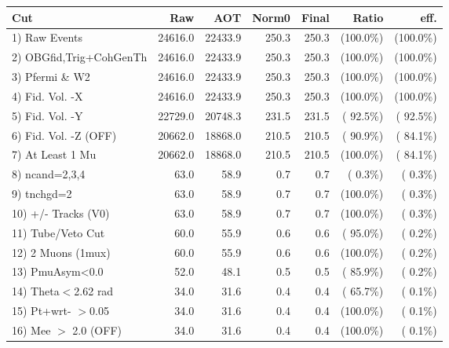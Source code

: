  \begin{table}[h!]\centering
 \begin{tabular}{||l||r|r|r|r|r|r||}
 \hline
 \hline
 Cut & Raw & AOT & Norm0 & Final & Ratio & eff.       \\
 \hline
  1) Raw Events           &      24616.0 &      22433.9 &        250.3 &        250.3 & (100.0\%) & (100.0\%) \\
  2) OBGfid,Trig+CohGenTh &      24616.0 &      22433.9 &        250.3 &        250.3 & (100.0\%) & (100.0\%) \\
  3) Pfermi \& W2         &      24616.0 &      22433.9 &        250.3 &        250.3 & (100.0\%) & (100.0\%) \\
  4) Fid. Vol. -X         &      24616.0 &      22433.9 &        250.3 &        250.3 & (100.0\%) & (100.0\%) \\
  5) Fid. Vol. -Y         &      22729.0 &      20748.3 &        231.5 &        231.5 & ( 92.5\%) & ( 92.5\%) \\
  6) Fid. Vol. -Z (OFF)   &      20662.0 &      18868.0 &        210.5 &        210.5 & ( 90.9\%) & ( 84.1\%) \\
  7) At Least 1 Mu        &      20662.0 &      18868.0 &        210.5 &        210.5 & (100.0\%) & ( 84.1\%) \\
  8) ncand=2,3,4          &         63.0 &         58.9 &          0.7 &          0.7 & (  0.3\%) & (  0.3\%) \\
  9) tnchgd=2             &         63.0 &         58.9 &          0.7 &          0.7 & (100.0\%) & (  0.3\%) \\
 10) +/- Tracks (V0)      &         63.0 &         58.9 &          0.7 &          0.7 & (100.0\%) & (  0.3\%) \\
 11) Tube/Veto Cut        &         60.0 &         55.9 &          0.6 &          0.6 & ( 95.0\%) & (  0.2\%) \\
 12) 2 Muons (1mux)       &         60.0 &         55.9 &          0.6 &          0.6 & (100.0\%) & (  0.2\%) \\
 13) PmuAsym<0.0          &         52.0 &         48.1 &          0.5 &          0.5 & ( 85.9\%) & (  0.2\%) \\
 14) Theta$<$2.62 rad     &         34.0 &         31.6 &          0.4 &          0.4 & ( 65.7\%) & (  0.1\%) \\
 15) Pt+wrt- $>$0.05      &         34.0 &         31.6 &          0.4 &          0.4 & (100.0\%) & (  0.1\%) \\
 16) Mee $>$ 2.0  (OFF)   &         34.0 &         31.6 &          0.4 &          0.4 & (100.0\%) & (  0.1\%) \\

\end{tabular}
\end{table}
